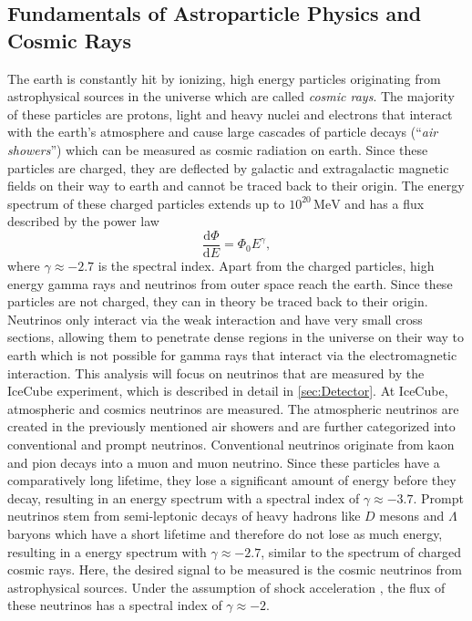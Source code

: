 \subsection{Fundamentals of Astroparticle Physics and Cosmic Rays}
The earth is constantly hit by ionizing, high energy particles originating from astrophysical sources in the universe which are called \textit{cosmic rays}. 
The majority of these particles are protons, light and heavy nuclei and electrons that interact with the earth's atmosphere and cause large cascades of particle decays 
(\enquote{\textit{air showers}})
which can be measured as cosmic radiation on earth. Since these particles are charged, they are deflected by galactic and extragalactic magnetic fields on their way to earth and 
cannot be traced back to their origin. The energy spectrum of these charged particles extends up to $10^{20}\, \unit{\mega\eV}$ and has a flux described by the power law 
\begin{equation}
    \frac{\mathrm{d}\Phi}{\mathrm{d}E} = \Phi_0 E^\gamma,
    \label{eq:flux}
\end{equation}
where $\gamma \approx \num{-2.7}$ is the spectral index.
Apart from the charged particles, high energy gamma rays and neutrinos from outer space reach the earth. Since these particles are not charged, they can in theory be 
traced back to their origin. Neutrinos only interact via the weak interaction and have very small cross sections, allowing them to penetrate dense regions in the universe on 
their way to earth which is not possible for gamma rays that interact via the electromagnetic interaction.
This analysis will focus on neutrinos that are measured by the IceCube experiment, which is described in detail in \autoref{sec:Detector}.
At IceCube, atmospheric and cosmics neutrinos are measured. The atmospheric neutrinos are created in the previously mentioned air showers and are further categorized into 
conventional and prompt neutrinos. Conventional neutrinos originate from kaon and pion decays into a muon and muon neutrino. Since these particles have a comparatively long
lifetime, they lose a significant amount of energy before they decay, resulting in an energy spectrum with a spectral index of $\gamma \approx \num{-3.7}$. 
Prompt neutrinos stem from semi-leptonic decays of heavy hadrons like $D$ mesons and $\Lambda$ baryons which have a short lifetime and therefore do not lose as much energy,
resulting in a energy spectrum with $\gamma \approx \num{-2.7}$, similar to the spectrum of charged cosmic rays. Here, the desired signal to be measured is the cosmic neutrinos from astrophysical sources. 
Under the assumption of shock acceleration \cite{Fermi1949}, the flux of these neutrinos has a spectral index of $\gamma \approx \num{-2}$.

